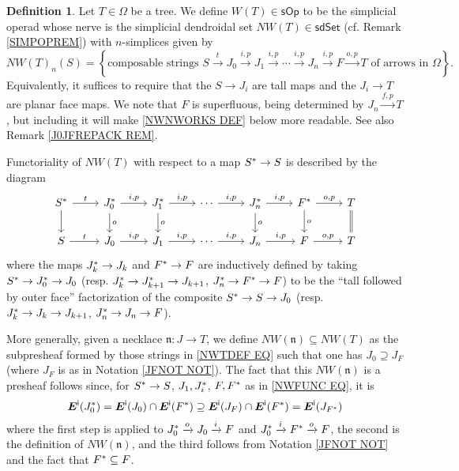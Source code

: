 \documentclass[a4paper,10pt
,draft
]{article}%
\numberwithin{equation}{section}
\numberwithin{figure}{section}
\theoremstyle{definition} %
\newtheorem{definition}[equation]{Definition}%
\newcommand{\1}{\ensuremath{\mathbbm 1}}%
\begin{document}
\begin{definition}\label{NWTNS DEF}
	Let $T \in \Omega$ be a tree.
	We define 
	$W(T) \in \mathsf{sOp}$
	to be the simplicial operad whose nerve is the 
	simplicial dendroidal set 
	$NW(T) \in \mathsf{sdSet}$
	(cf. Remark \ref{SIMPOPREM})
	with $n$-simplices given by
\begin{equation}\label{NWTDEF EQ}
	NW(T)_n(S)
=
	\left\{
	\text{composable strings }
	S \xrightarrow{t} 
	J_0 \xrightarrow{i,p} 
	J_1 \xrightarrow{i,p} 
	\cdots \xrightarrow{i,p}
	J_n \xrightarrow{i,p}
	F \xrightarrow{o,p}
	T
	\text{ of arrows in $\Omega$}
	\right\}.
\end{equation}
	Equivalently, 
	it suffices to require that the
	$S \to J_i$ are tall maps
	and the $J_i \to T$ are planar face maps.
	We note that $F$ is superfluous, 
	being determined by $J_n \xrightarrow{f,p} T$,
	but including it will make \eqref{NWNWORKS DEF} 
	below more readable.
	See also Remark \ref{J0JFREPACK REM}.

	Functoriality of 
	$NW(T)$
	with respect to a map $S^{\**} \to S$
	is described by the diagram
\begin{equation}\label{NWFUNC EQ}
\begin{tikzcd}
	S^{\**} \ar{r}{t} \ar{d}
&
	J^{\**}_0 \ar{r}{i,p} \ar{d}{o}
&
	J^{\**}_1 \ar{r}{i,p} \ar{d}{o}
&
	\cdots \ar{r}{i,p}
&
	J^{\**}_n \ar{r}{i,p} \ar{d}{o}
&
	F^{\**} \ar{r}{o,p} \ar{d}{o}
&
	T \ar[equal]{d}
\\
	S \ar{r}{t} 
&
	J_0 \ar{r}{i,p}
&
	J_1 \ar{r}{i,p}
&
	\cdots \ar{r}{i,p}
&
	J_n \ar{r}{i,p}
&
	F \ar{r}{o,p}
&
	T	
\end{tikzcd}
\end{equation}
	where the maps $J^{\**}_k \to J_k$ and 
	$F^{\**} \to F$
	are inductively defined by taking
	$S^{\**} \to J^{\**}_0 \to J_0$
	(resp. $J^{\**}_k \to J^{\**}_{k+1} \to J_{k+1}$,
	$J^{\**}_n \to F^{\**} \to F$)
	to be the ``tall followed by outer face''
	factorization of the composite
	$S^{\**} \to S \to J_0$
	(resp. $J^{\**}_k \to J_{k} \to J_{k+1}$,
	$J^{\**}_n \to J_n \to F$).

	More generally, 
	given a necklace $\mathfrak{n}\colon J \to T$,
	we define
	$NW(\mathfrak{n}) \subseteq NW(T)$
	as the subpresheaf formed by those strings in 
	\eqref{NWTDEF EQ} such that
	one has $J_0 \supseteq J_{F}$
	(where $J_{F}$ is as in Notation \ref{JFNOT NOT}).
	The fact that this $NW(\mathfrak{n})$ is a presheaf follows 
	since, for $S^{\**} \to S$, 
	$J_1,J_i^{\**}$, $F,F^{\**}$ as in \eqref{NWFUNC EQ},
	it is
\begin{equation}\label{NWNWORKS DEF}
	\boldsymbol{E}^{\mathsf{i}}(J^{\**}_0)
=
	\boldsymbol{E}^{\mathsf{i}}(J_0)
	\cap
	\boldsymbol{E}^{\mathsf{i}}(F^{\**})
\supseteq
	\boldsymbol{E}^{\mathsf{i}}(J_{F})
	\cap
	\boldsymbol{E}^{\mathsf{i}}(F^{\**})
=
	\boldsymbol{E}^{\mathsf{i}}(J_{F^{\**}})
\end{equation}
where the first step is 
\cite[Lemma 2.5]{BP_edss}
applied to 
$J^{\**}_0 \xrightarrow{o} J_0 \xrightarrow{i} F$
and 
$J^{\**}_0 \xrightarrow{i} 
F^{\**} \xrightarrow{o}
F$,
the second is the definition of $NW(\mathfrak{n})$,
and the third follows from Notation \ref{JFNOT NOT}
and the fact that $F^{\**} \subseteq F$.
\end{definition}
\end{document}
